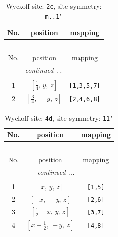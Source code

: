 \documentclass[fleqn,8pt]{jsarticle}
\begin{document}
\begin{longtable}{ccc}
\caption{Wyckoff site: {\tt 2c}, site symmetry: {\tt m..1'}}
 \\
 \hline \hline
No. & position & mapping \\ \hline \endfirsthead

\multicolumn{2}{l}{\tablename\ \thetable{}} \\
 \hline \hline
No. & position & mapping \\ \hline \endhead

 \hline \hline
\multicolumn{2}{r}{\footnotesize\it continued ...} \\ \endfoot

 \hline \hline
\multicolumn{2}{r}{} \\ \endlastfoot

1 & $\left[ \frac{1}{4},\, y,\, z \right]$ & {\tt [1,3,5,7]} \\ \hline
2 & $\left[ \frac{3}{4},\, - y,\, z \right]$ & {\tt [2,4,6,8]} \\
\end{longtable}
\renewcommand{\arraystretch}{1.2}
\begin{longtable}{ccc}
\caption{Wyckoff site: {\tt 4d}, site symmetry: {\tt 11'}}
 \\
 \hline \hline
No. & position & mapping \\ \hline \endfirsthead

\multicolumn{2}{l}{\tablename\ \thetable{}} \\
 \hline \hline
No. & position & mapping \\ \hline \endhead

 \hline \hline
\multicolumn{2}{r}{\footnotesize\it continued ...} \\ \endfoot

 \hline \hline
\multicolumn{2}{r}{} \\ \endlastfoot

1 & $\left[ x,\, y,\, z \right]$ & {\tt [1,5]} \\ \hline
2 & $\left[ - x,\, - y,\, z \right]$ & {\tt [2,6]} \\ \hline
3 & $\left[ \frac{1}{2} - x,\, y,\, z \right]$ & {\tt [3,7]} \\ \hline
4 & $\left[ x + \frac{1}{2},\, - y,\, z \right]$ & {\tt [4,8]} \\
\end{longtable}
\end{document}
